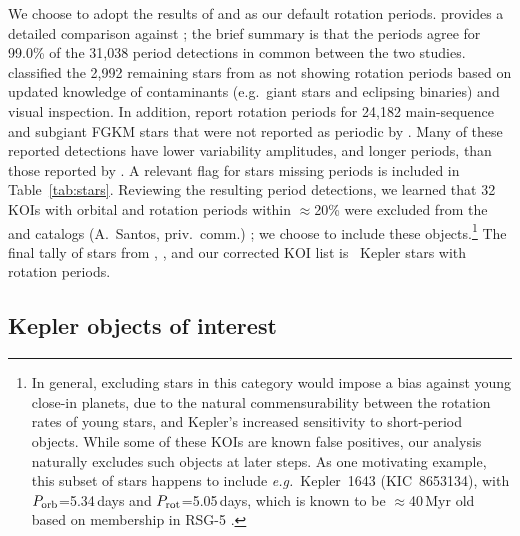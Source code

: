 \documentclass[11pt,twocolumn,tighten]{aastex63}
\begin{document}
We choose to adopt the results of  and
 as our default rotation periods.
 provides a detailed comparison against
; the brief summary is that the periods
agree for 99.0\% of the 31{,}038 period detections in common between
the two studies.   classified the 2{,}992
remaining stars from  as not showing
rotation periods based on updated knowledge of contaminants
(e.g.~giant stars and eclipsing binaries) and visual inspection.
In addition,
 report rotation periods for 24{,}182
main-sequence and subgiant FGKM stars that were not reported as
periodic by .  Many of
these reported detections have lower variability amplitudes, and
longer periods, than those reported by
.  A relevant flag for stars
missing  periods is included in
Table~\ref{tab:stars}.  Reviewing the resulting period detections, we
learned that 32 KOIs with orbital and rotation periods within
$\approx$20\% were excluded from the  and
 catalogs (A.~Santos, priv.~comm.) ; we choose
to include these objects.\footnote{In general, excluding stars in this
category would impose a bias against young close-in planets, due to
the natural commensurability between the rotation rates of young
stars, and Kepler's increased sensitivity to short-period objects.
While some of these KOIs are known false positives, our analysis
naturally excludes such objects at later steps.  As one motivating
example, this subset of stars happens to include {\it
e.g.}~Kepler~1643 (KIC~8653134), with $P_{\rm orb}$=5.34\,days and
$P_{\rm rot}$=5.05\,days, which is known to be $\approx$40\,Myr old
based on membership in RSG-5 \citep{Bouma_2022b}.  }
The final tally of stars from ,
, and our corrected KOI list is
\nuniqstarsantosrot\ Kepler stars with rotation periods.





\subsection{Kepler objects of interest}
\label{subsec:planetsel}
\end{document}
